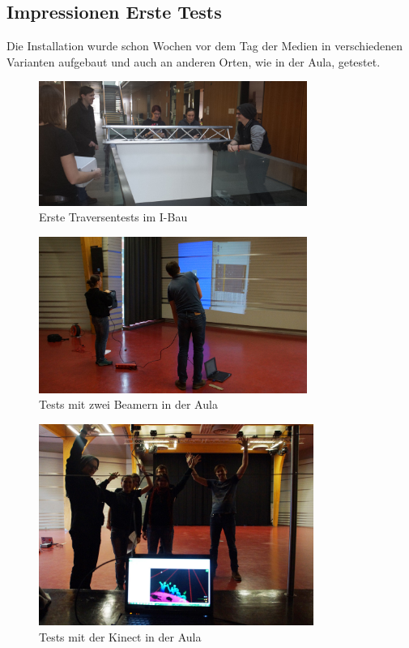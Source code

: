 \clearpage

\subsection{Impressionen Erste Tests}
Die Installation wurde schon Wochen vor dem Tag der Medien in verschiedenen Varianten aufgebaut und auch an anderen Orten, wie in der Aula, getestet.

\begin{figure}[htbp]
	\centering
		\includegraphics[width=0.78\textwidth]{images/Test4.jpg}
	\caption{Erste Traversentests im I-Bau}
	\label{fig:Test4}
\end{figure}

\begin{figure}[htbp]
	\centering
		\includegraphics[width=0.78\textwidth]{images/Test1.jpg}
	\caption{Tests mit zwei Beamern in der Aula}
	\label{fig:Test1}
\end{figure}

\begin{figure}[htbp]
	\centering
		\includegraphics[width=0.8\textwidth]{images/Test2.jpg}
	\caption{Tests mit der Kinect in der Aula}
	\label{fig:Test2}
\end{figure}

